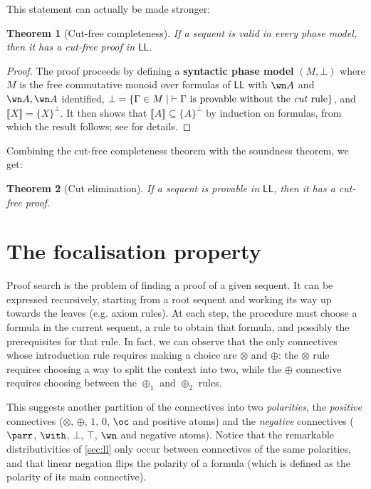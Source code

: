 \documentclass[11pt]{article}
\newtheorem{theorem}{Theorem}[section]
\newcommand\LL{\textsf{LL}}
\newcommand\0{\textbf{0}}
\newcommand\1{\textbf{1}}
\newcommand\sem[1]{{\llbracket #1 \rrbracket}}
\begin{document}
This statement can actually be made stronger:
\begin{theorem}[Cut-free completeness]
    \label{completeness}
    If a sequent is valid in every phase model, then it has a cut-free proof in $\LL$.
\end{theorem}
\begin{proof}
    The proof proceeds by defining a \textbf{syntactic phase model} $(M, \bot)$ where $M$ is the free commutative
    monoid over formulas of $\LL$ with $\wn A$ and $\wn A, \wn A$ identified,
    $\bot = \{\Gamma\in M\mid\; \vdash \Gamma\text{ is provable without the \textit{cut} rule}\}$, and $\sem{X} = \{X\}^\perp$.
    It then shows that $\sem{A}\subseteq\{A\}^\perp$ by induction on formulas, from which the result follows;
    see \cite[theorem 3]{okada} for details.
\end{proof}

Combining the cut-free completeness theorem with the soundness theorem, we get:
\begin{theorem}[Cut elimination]
    If a sequent is provable in $\LL$, then it has a cut-free proof.
\end{theorem}

\section{\label{sec:focalisation}The focalisation property}

Proof search is the problem of finding a proof of a given sequent. It can be expressed recursively, starting
from a root sequent and working its way up towards the leaves (e.g. axiom rules). At each step, the procedure
must choose a formula in the current sequent, a rule to obtain that formula, and possibly the prerequisites for
that rule. In fact, we can observe that the only connectives whose introduction rule requires making a choice are
$\otimes$ and $\oplus$: the $\otimes$ rule requires choosing a way to split the context into two, while the $\oplus$
connective requires choosing between the $\oplus_1$ and $\oplus_2$ rules.

This suggests another partition of the connectives into two \emph{polarities}, the \emph{positive} connectives
($\otimes$, $\oplus$, $1$, $0$, $\oc$ and positive atoms) and the \emph{negative} connectives
($\parr$, $\with$, $\bot$, $\top$, $\wn$ and negative atoms).
Notice that the remarkable distributivities of \cref{sec:ll} only occur between connectives of the same polarities,
and that linear negation flips the polarity of a formula (which is defined as the polarity of its main connective).
\end{document}
